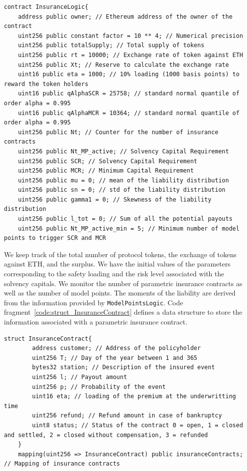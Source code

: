 \documentclass[10pt]{article}
\begin{document}
\begin{codefragment}[!h]
\begin{lstlisting}[language=Solidity]
contract InsuranceLogic{
    address public owner; // Ethereum address of the owner of the contract
    uint256 public constant factor = 10 ** 4; // Numerical precision
    uint256 public totalSupply; // Total supply of tokens
    uint256 public rt = 10000; // Exchange rate of token against ETH
    uint256 public Xt; // Reserve to calculate the exchange rate
    uint16 public eta = 1000; // 10% loading (1000 basis points) to reward the token holders
    uint16 public qAlphaSCR = 25758; // standard normal quantile of order alpha = 0.995
    uint16 public qAlphaMCR = 10364; // standard normal quantile of order alpha = 0.995
    uint256 public Nt; // Counter for the number of insurance contracts
    uint256 public Nt_MP_active; // Solvency Capital Requirement
    uint256 public SCR; // Solvency Capital Requirement
    uint256 public MCR; // Minimum Capital Requirement
    uint256 public mu = 0; // mean of the liability distribution
    uint256 public sn = 0; // std of the liability distribution
    uint256 public gamma1 = 0; // Skewness of the liability distribution
    uint256 public l_tot = 0; // Sum of all the potential payouts
    uint256 public Nt_MP_active_min = 5; // Minimum number of model points to trigger SCR and MCR
    \end{lstlisting}
    \caption{Contract and variable declaration of \texttt{InsuranceLogic}.}
    \label{code:declaration_InsuranceLogic}
\end{codefragment}

We keep track of the total number of protocol tokens, the exchange of tokens against ETH, and the surplus. We have the initial values of the parameters corresponding to the safety loading and the risk level associated with the solvency capitals. We monitor the number of parametric insurance contracts as well as the number of model points. The moments of the liability are derived from the information provided by \texttt{ModelPointsLogic}. Code fragment~\ref{code:struct_InsuranceContract} defines a data structure to store the information associated with a parametric insurance contract.


\begin{codefragment}[!h]
\begin{lstlisting}[language=Solidity]
 struct InsuranceContract{
        address customer; // Address of the policyholder
        uint256 T; // Day of the year between 1 and 365
        bytes32 station; // Description of the insured event
        uint256 l; // Payout amount
        uint256 p; // Probability of the event
        uint16 eta; // loading of the premium at the underwritting time
        uint256 refund; // Refund amount in case of bankruptcy
        uint8 status; // Status of the contract 0 = open, 1 = closed and settled, 2 = closed without compensation, 3 = refunded
    }
    mapping(uint256 => InsuranceContract) public insuranceContracts; // Mapping of insurance contracts

\end{lstlisting}
    \caption{\texttt{InsuranceContract} data structure}
    \label{code:struct_InsuranceContract}
\end{codefragment}
\end{document}
